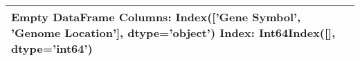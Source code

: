 \begin{tabular}{ll}
\toprule
Empty DataFrame
Columns: Index(['Gene Symbol', 'Genome Location'], dtype='object')
Index: Int64Index([], dtype='int64') \\
\bottomrule
\end{tabular}
